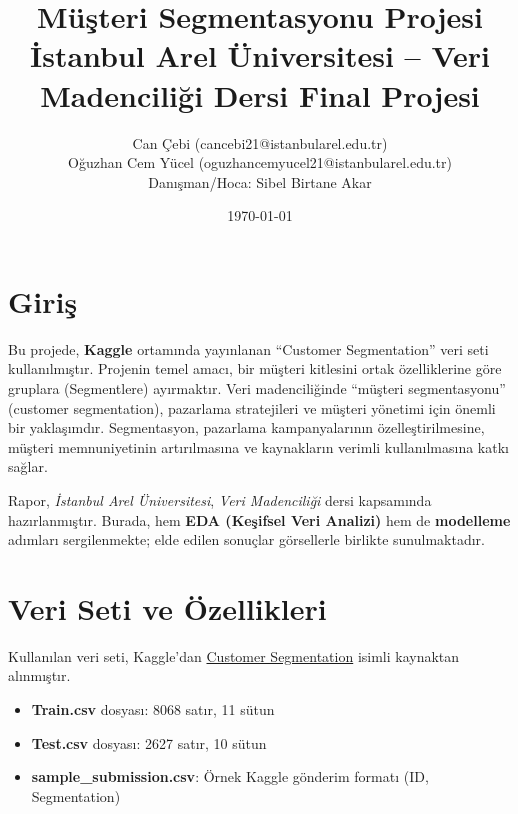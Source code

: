 \documentclass{article}
\title{\textbf{Müşteri Segmentasyonu Projesi}\\
        \large İstanbul Arel Üniversitesi – Veri Madenciliği Dersi Final Projesi}
\author{
    Can Çebi \quad (cancebi21@istanbularel.edu.tr)\\
    Oğuzhan Cem Yücel \quad (oguzhancemyucel21@istanbularel.edu.tr)\\
    \vspace{5pt}
    Danışman/Hoca: Sibel Birtane Akar
}
\date{\today}
\begin{document}
\maketitle

\section{Giriş}

Bu projede, \textbf{Kaggle} ortamında yayınlanan “Customer Segmentation” veri seti kullanılmıştır. Projenin temel amacı, bir müşteri kitlesini ortak özelliklerine göre gruplara (Segmentlere) ayırmaktır. Veri madenciliğinde “müşteri segmentasyonu” (customer segmentation), pazarlama stratejileri ve müşteri yönetimi için önemli bir yaklaşımdır. Segmentasyon, pazarlama kampanyalarının özelleştirilmesine, müşteri memnuniyetinin artırılmasına ve kaynakların verimli kullanılmasına katkı sağlar.

Rapor, \textit{İstanbul Arel Üniversitesi}, \textit{Veri Madenciliği} dersi kapsamında hazırlanmıştır. Burada, hem \textbf{EDA (Keşifsel Veri Analizi)} hem de \textbf{modelleme} adımları sergilenmekte; elde edilen sonuçlar görsellerle birlikte sunulmaktadır.

\section{Veri Seti ve Özellikleri}

Kullanılan veri seti, Kaggle’dan \href{https://www.kaggle.com/datasets/vetrirah/customer}{Customer Segmentation} isimli kaynaktan alınmıştır.

\begin{itemize}
    \item \textbf{Train.csv} dosyası: 8068 satır, 11 sütun
    \item \textbf{Test.csv} dosyası: 2627 satır, 10 sütun
    \item \textbf{sample\_submission.csv}: Örnek Kaggle gönderim formatı (ID, Segmentation)
\end{itemize}
\end{document}
